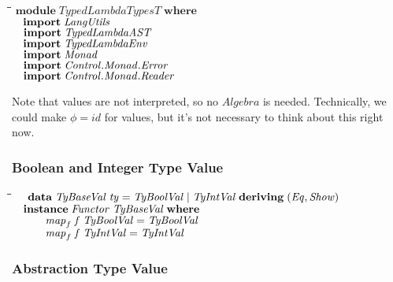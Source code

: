 \documentclass[10pt]{article}
\newlength{\lwidth}\setlength{\lwidth}{4.5cm}
\newlength{\cwidth}\setlength{\cwidth}{8mm} %
\newcommand{\Conid}[1]{\mathit{#1}}
\newcommand{\Varid}[1]{\mathit{#1}}
\begin{document}
\begin{tabbing}
\qquad\=\hspace{\lwidth}\=\hspace{\cwidth}\=\+\kill
${\mathbf{module}\;\Conid{TypedLambdaTypesT}\;\mathbf{where}}$\\
${\hskip1.00em\relax\mathbf{import}\;\Conid{LangUtils}}$\\
${\hskip1.00em\relax\mathbf{import}\;\Conid{TypedLambdaAST}}$\\
${\hskip1.00em\relax\mathbf{import}\;\Conid{TypedLambdaEnv}}$\\
${\hskip1.00em\relax\mathbf{import}\;\Conid{Monad}}$\\
${\hskip1.00em\relax\mathbf{import}\;\Conid{\Conid{Control}.\Conid{Monad}.Error}}$\\
${\hskip1.00em\relax\mathbf{import}\;\Conid{\Conid{Control}.\Conid{Monad}.Reader}}$
\end{tabbing}
Note that values are not interpreted, so no \ensuremath{\Conid{Algebra}} is needed.
Technically, we could make \ensuremath{\Varid{\phi}\mathrel{=}\Varid{id}} for values, but it's not
necessary to think about this right now.

\subsubsection{Boolean and Integer Type Value}

\begin{tabbing}
\qquad\=\hspace{\lwidth}\=\hspace{\cwidth}\=\+\kill
${\hskip1.00em\relax\mathbf{data}\;\Conid{TyBaseVal}\;\Varid{ty}\mathrel{=}\Conid{TyBoolVal}\mid \Conid{TyIntVal}\;\mathbf{deriving}\;(\Conid{Eq},\Conid{Show})}$\\
${}$\\
${\hskip1.00em\relax\mathbf{instance}\;\Conid{Functor}\;\Conid{TyBaseVal}\;\mathbf{where}}$\\
${\hskip1.00em\relax\hskip2.00em\relax\Varid{map}_{f}\;\Varid{f}\;\Conid{TyBoolVal}\mathrel{=}\Conid{TyBoolVal}}$\\
${\hskip1.00em\relax\hskip2.00em\relax\Varid{map}_{f}\;\Varid{f}\;\Conid{TyIntVal}\mathrel{=}\Conid{TyIntVal}}$
\end{tabbing}
\subsubsection{Abstraction Type Value}
\end{document}
